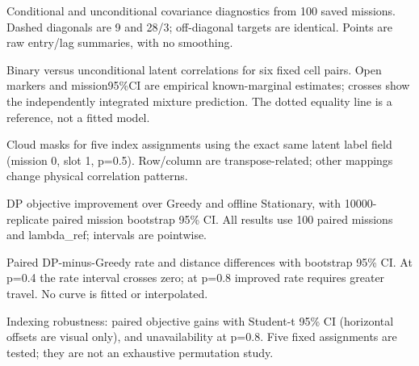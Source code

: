 \caption{Conditional and unconditional covariance diagnostics from 100 saved missions. Dashed diagonals are 9 and 28/3; off-diagonal targets are identical. Points are raw entry/lag summaries, with no smoothing.}

\caption{Binary versus unconditional latent correlations for six fixed cell pairs. Open markers and mission95\%CI are empirical known-marginal estimates; crosses show the independently integrated mixture prediction. The dotted equality line is a reference, not a fitted model.}

\caption{Cloud masks for five index assignments using the exact same latent label field (mission 0, slot 1, p=0.5). Row/column are transpose-related; other mappings change physical correlation patterns.}

\caption{DP objective improvement over Greedy and offline Stationary, with 10000-replicate paired mission bootstrap 95\% CI. All results use 100 paired missions and lambda\_ref; intervals are pointwise.}

\caption{Paired DP-minus-Greedy rate and distance differences with bootstrap 95\% CI. At p=0.4 the rate interval crosses zero; at p=0.8 improved rate requires greater travel. No curve is fitted or interpolated.}

\caption{Indexing robustness: paired objective gains with Student-t 95\% CI (horizontal offsets are visual only), and unavailability at p=0.8. Five fixed assignments are tested; they are not an exhaustive permutation study.}
